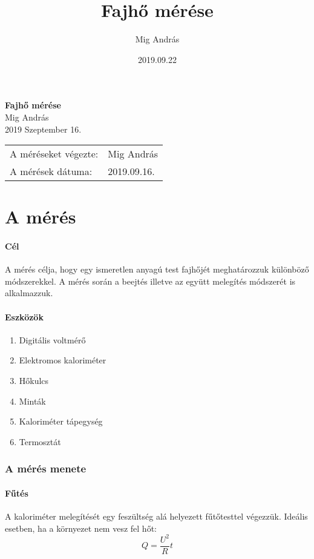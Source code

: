 \documentclass[a4paper, 12pt, oneside]{article}
\title{Fajhő mérése}
\author{Mig András}
\date{2019.09.22}
\begin{document}
\begin{titlepage}
\begin{center}
    \LARGE{\textbf{Fajhő mérése}}\\
    \vspace{0.5cm}
    Mig András\\
    2019 Szeptember 16.
\end{center}
\begin{table}[!b]
\begin{tabular}{ll}
    A méréseket végezte:  & Mig András  \\
    A mérések dátuma: & 2019.09.16. 
\end{tabular}
\end{table}
\end{titlepage}


\newpage\null\thispagestyle{empty}\newpage
\part*{A mérés}
\subsection*{Cél}
    A mérés célja, hogy egy ismeretlen anyagú test fajhőjét meghatározzuk különböző módszerekkel. A mérés során a beejtés illetve az együtt melegítés módszerét is alkalmazzuk.
\subsection*{Eszközök}
\begin{enumerate}
    \item Digitális voltmérő
    \item Elektromos kaloriméter
    \item Hőkulcs
    \item Minták
    \item Kaloriméter tápegység
    \item Termosztát
\end{enumerate}
\section* {A mérés menete}


\subsection*{Fűtés}
    A kaloriméter melegítését egy feszültség alá helyezett fűtőtesttel végezzük. Ideális esetben, ha a környezet nem vesz fel hőt:
\begin{equation}
    Q = \frac{U^2}{R}t
\end{equation}
\end{document}
